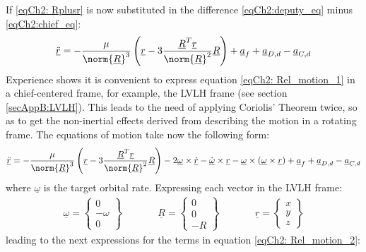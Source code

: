	\indent If \eqref{eqCh2: 	Rplusr} is now substituted in the difference \eqref{eqCh2:deputy_eq} minus \eqref{eqCh2:chief_eq}:
	\begin{equation}
	\underline{\ddot{r}} = - \dfrac{\mu}{\norm{\underline{R}}^3} \left(\underline{r} - 3 \dfrac{\underline{R}^T \underline{r}}{\norm{\underline{R}}^2} \underline{R} \right) + \underline{a}_f + \underline{a}_{D, d} - \underline{a}_{C, d}
	\label{eqCh2: 	Rel_motion_1}
	\end{equation}
	\indent Experience shows it is convenient to express equation \eqref{eqCh2: 	Rel_motion_1} in a chief-centered frame, for example, the LVLH frame (see section \ref{secAppB:LVLH}). This leads to the need of applying Coriolis' Theorem twice, so as to get the non-inertial effects derived from describing the motion in a rotating frame. The equations of motion take now the following form:
	\begin{equation}
	\underline{\ddot{r}} = - \dfrac{\mu}{\norm{\underline{R}}^3} \left(\underline{r} - 3 \dfrac{\underline{R}^T \underline{r}}{\norm{\underline{R}}^2} \underline{R} \right) - 2 \underline{\omega}\times  \underline{\dot{r}} - \underline{\dot{\omega}}\times \underline{r} - \underline{\omega}\times \left( \underline{\omega} \times \underline{r}\right) + \underline{a}_f + \underline{a}_{D, d} - \underline{a}_{C, d}
	\label{eqCh2: 	Rel_motion_2}
	\end{equation}
	\noindent where $\underline{\omega}$ is the target orbital rate. Expressing each vector in the LVLH frame:
	\begin{align}
	\underline{\omega} = 
	\left\{ \begin{array}{c}
	0 \\
	-\omega \\
	0
	\end{array}\right\} 
	& \qquad &
	\underline{R} = 
	\left\{ \begin{array}{c}
	0 \\
	0 \\
	-R
	\end{array}\right\} 
	& \qquad &
	\underline{r} = 
	\left\{ \begin{array}{c}
	x \\
	y \\
	z
	\end{array}\right\} 
	\end{align}
	\noindent leading to the next expressions for the terms in equation \eqref{eqCh2: 	Rel_motion_2}:
